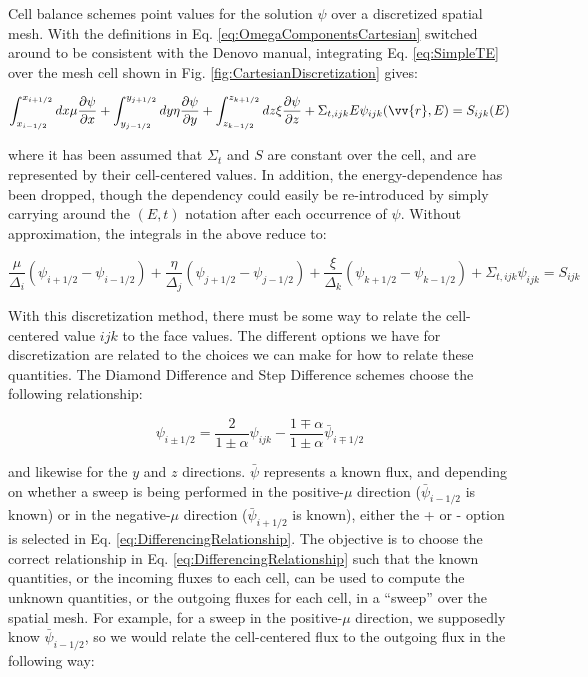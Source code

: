 \documentclass[10pt]{article}
\newcounter{subsubsubsection}[subsubsection]
\begin{document}
\begin{flushleft}

Cell balance schemes point values for the solution \(\psi\) over a discretized spatial mesh. With the definitions in Eq. \eqref{eq:OmegaComponentsCartesian} switched around to be consistent with the Denovo manual, integrating Eq. \eqref{eq:SimpleTE} over the mesh cell shown in Fig. \ref{fig:CartesianDiscretization} gives:

\begin{equation}
\int_{x_{i-1/2}}^{x_{i+1/2}}dx\mu \frac{\partial \psi}{\partial x}+\int_{y_{j-1/2}}^{y_{j+1/2}}dy\eta \frac{\partial \psi}{\partial y}+\int_{z_{k-1/2}}^{z_{k+1/2}}dz\xi \frac{\partial \psi}{\partial z}+\Sigma_{t,ijk}{E}\psi_{ijk}(\vv{r},E)=S_{ijk}(E)
\end{equation}

where it has been assumed that \(\Sigma_t\) and \(S\) are constant over the cell, and are represented by their cell-centered values. In addition, the energy-dependence has been dropped, though the dependency could easily be re-introduced by simply carrying around the \((E, t)\) notation after each occurrence of \(\psi\). Without approximation, the integrals in the above reduce to:

\begin{equation}
\label{eq:DiscretizedCartesianTE}
\frac{\mu}{\Delta_i}(\psi_{i+1/2}-\psi_{i-1/2})+\frac{\eta}{\Delta_j}(\psi_{j+1/2}-\psi_{j-1/2})+\frac{\xi}{\Delta_k}(\psi_{k+1/2}-\psi_{k-1/2})+\Sigma_{t,ijk}\psi_{ijk}=S_{ijk}
\end{equation}

With this discretization method, there must be some way to relate the cell-centered value \(ijk\) to the face values. The different options we have for discretization are related to the choices we can make for how to relate these quantities. The Diamond Difference and Step Difference schemes choose the following relationship:

\begin{equation}
\label{eq:DifferencingRelationship}
\psi_{i\pm1/2}=\frac{2}{1\pm\alpha}\psi_{ijk}-\frac{1\mp\alpha}{1\pm\alpha}\bar{\psi}_{i\mp1/2}
\end{equation}

and likewise for the \(y\) and \(z\) directions. \(\bar{\psi}\) represents a known flux, and depending on whether a sweep is being performed in the positive-\(\mu\) direction (\(\bar{\psi}_{i-1/2}\) is known) or in the negative-\(\mu\) direction (\(\bar{\psi}_{i+1/2}\) is known), either the + or - option is selected in Eq. \eqref{eq:DifferencingRelationship}. The objective is to choose the correct relationship in Eq. \eqref{eq:DifferencingRelationship} such that the known quantities, or the incoming fluxes to each cell, can be used to compute the unknown quantities, or the outgoing fluxes for each cell, in a ``sweep'' over the spatial mesh. For example, for a sweep in the positive-\(\mu\) direction, we supposedly know \(\bar{\psi}_{i-1/2}\), so we would relate the cell-centered flux to the outgoing flux in the following way:


\end{flushleft}
\end{document}
